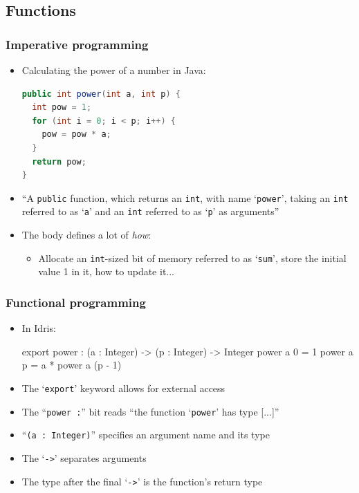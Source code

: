 \documentclass{beamer}
\begin{document}
  \subsection{Functions}
  \begin{frame}[fragile]
    \frametitle{Imperative programming}

    \begin{itemize}
      \item Calculating the power of a number in Java:
            \vspace*{-1mm}
      {\footnotesize
       \begin{lstlisting}[language=java]
public int power(int a, int p) {
  int pow = 1;
  for (int i = 0; i < p; i++) {
    pow = pow * a;
  }
  return pow;
}
      \end{lstlisting}}
      \vspace*{-2mm}
      \item ``A \texttt{public} function, which returns an \texttt{int}, with name
            `\texttt{power}', taking an \texttt{int} referred to as `\texttt{a}'
            and an \texttt{int} referred to as `\texttt{p}' as arguments''
      \item The body defines a lot of \textit{how}:
        \begin{itemize}
          \item Allocate an \texttt{int}-sized bit of memory referred to as
                `\texttt{sum}', store the initial value 1 in it, how to update
                it...
        \end{itemize}
    \end{itemize}

  \end{frame}

  \begin{frame}[fragile]
    \frametitle{Functional programming}

    \begin{itemize}
      \item In Idris:
            \vspace*{-5mm}
      {\footnotesize
        \begin{idrislisting}
export
power : (a : Integer) -> (p : Integer) -> Integer
power a 0 = 1
power a p = a * power a (p - 1)
      \end{idrislisting}}
      \vspace*{-1mm}
      \item The `\texttt{export}' keyword allows for external access
      \item The ``\texttt{power :}'' bit reads ``the function `\texttt{power}'
            has type [...]''
      \item ``\texttt{(a : Integer)}'' specifies an argument name and its type
      \item The `\texttt{->}' separates arguments
      \item The type after the final `\texttt{->}' is the function's return type
    \end{itemize}

  \end{frame}
\end{document}
